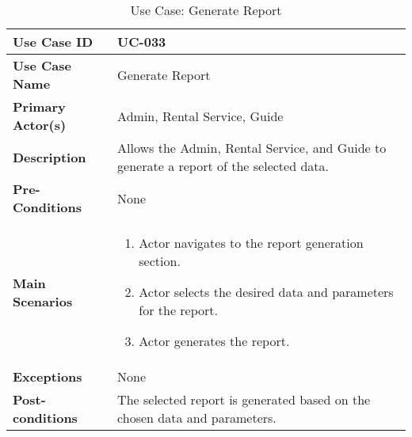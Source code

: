 \begin{table}[ht]
    \centering
    \begin{tabular}{|l|p{}|}
        \hline
        \textbf{Use Case ID} & UC-033 \\
        \hline
        \textbf{Use Case Name} & Generate Report \\
        \hline
        \textbf{Primary Actor(s)} & Admin, Rental Service, Guide \\
        \hline
        \textbf{Description} & Allows the Admin, Rental Service, and Guide to generate a report of the selected data. \\
        \hline
        \textbf{Pre-Conditions} & None \\
        \hline
        \textbf{Main Scenarios} & 
        \begin{enumerate}[label=\arabic*.,itemsep=0pt]
            \item Actor navigates to the report generation section.
            \item Actor selects the desired data and parameters for the report.
            \item Actor generates the report.
        \end{enumerate} \\
        \hline
        \textbf{Exceptions} & None \\
        \hline
        \textbf{Post-conditions} & The selected report is generated based on the chosen data and parameters. \\
        \hline
    \end{tabular}
    \label{tab:use-case-generate-report}
    \caption{Use Case: Generate Report}
\end{table}

